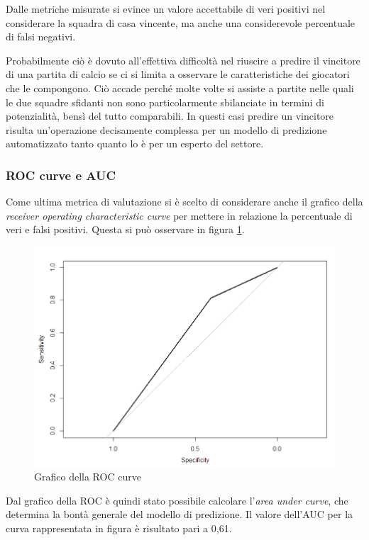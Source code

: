 \documentclass[hidelinks, 12pt]{article}
\begin{document}
Dalle metriche misurate si evince un valore accettabile di veri positivi nel considerare la squadra di casa vincente, ma anche una considerevole percentuale di falsi negativi.

Probabilmente ciò è dovuto all'effettiva difficoltà nel riuscire a predire il vincitore di una partita di calcio se ci si limita a osservare le caratteristiche dei giocatori che le compongono. Ciò accade perché molte volte si assiste a partite nelle quali le due squadre sfidanti non sono particolarmente sbilanciate in termini di potenzialità, bensì del tutto comparabili. In questi casi predire un vincitore risulta un'operazione decisamente complessa per un modello di predizione automatizzato tanto quanto lo è per un esperto del settore.


\clearpage
\subsubsection{ROC curve e AUC}

Come ultima metrica di valutazione si è scelto di considerare anche il grafico della \textit{receiver operating characteristic curve} per mettere in relazione la percentuale di veri e falsi positivi. Questa si può osservare in figura \ref{fig:perf-roc}.

\begin{figure}[H]
	\centering
	\includegraphics[scale=0.6]{images/06_roc.png}
	\caption[Grafico della ROC curve]{Grafico della ROC curve}
	\label{fig:perf-roc}
\end{figure}

Dal grafico della ROC è quindi stato possibile calcolare l'\textit{area under curve}, che determina la bontà generale del modello di predizione. Il valore dell'AUC per la curva rappresentata in figura è risultato pari a 0,61.
\end{document}
